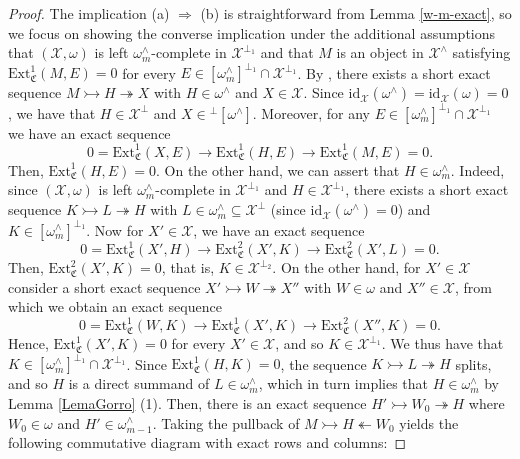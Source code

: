 \documentclass[10pt,reqno]{amsart}
\numberwithin{equation}{section}
\theoremstyle{remark}
\newcommand{\Ext}{\mathrm{Ext}}
\newcommand{\id}{\mathrm{id}}
\begin{document}
\begin{proof} 
The implication (a) $\Rightarrow$ (b) is straightforward from Lemma \ref{w-m-exact}, so we focus on showing the converse implication under the additional assumptions that $(\mathcal{X},\omega)$ is left $\omega^\wedge_m$-complete in $\mathcal{X}^{\perp_1}$ and that $M$ is an object in $\mathcal{X}^\wedge$ satisfying $\Ext^1_{\mathfrak{C}}(M,E) = 0$ for every $E \in [\omega^\wedge_m]^{\perp_1} \cap \mathcal{X}^{\perp_1}$. By \cite[Thm. 2.8]{BMSP}, there exists a short exact sequence $M \rightarrowtail H \twoheadrightarrow X$ with $H \in \omega^\wedge$ and $X \in \mathcal{X}$. Since $\id_{\mathcal{X}}(\omega^\wedge) = \id_{\mathcal{X}}(\omega) = 0$, we have that $H \in \mathcal{X}^{\perp}$ and $X \in {}^\perp[\omega^\wedge]$. Moreover, for any $E \in [\omega^\wedge_m]^{\perp_1} \cap \mathcal{X}^{\perp_1}$ we have an exact sequence
\[
0 = \Ext^1_{\mathfrak{C}}(X,E) \to \Ext^1_{\mathfrak{C}}(H,E) \to \Ext^1_{\mathfrak{C}}(M,E) = 0.
\]
Then, $\Ext^1_{\mathfrak{C}}(H,E) = 0$. On the other hand, we can assert that $H \in \omega^\wedge_m$. Indeed, since $(\mathcal{X},\omega)$ is left $\omega^\wedge_m$-complete in $\mathcal{X}^{\perp_1}$ and $H \in \mathcal{X}^{\perp_1}$, there exists a short exact sequence $K \rightarrowtail L \twoheadrightarrow H$ with $L \in \omega^\wedge_m \subseteq \mathcal{X}^{\perp}$ (since $\id_{\mathcal{X}}(\omega^\wedge) = 0$) and $K \in [\omega^\wedge_m]^{\perp_1}$. Now for $X' \in \mathcal{X}$, we have an exact sequence
\[
0 = \Ext^1_{\mathfrak{C}}(X',H) \to \Ext^2_{\mathfrak{C}}(X',K) \to \Ext^2_{\mathfrak{C}}(X',L) = 0.
\]
Then, $\Ext^2_{\mathfrak{C}}(X',K) = 0$, that is, $K \in \mathcal{X}^{\perp_2}$. On the other hand, for $X' \in \mathcal{X}$ consider a short exact sequence $X' \rightarrowtail W \twoheadrightarrow X''$ with $W \in \omega$ and $X'' \in \mathcal{X}$, from which we obtain an exact sequence
\[
0 = \Ext^1_{\mathfrak{C}}(W,K) \to \Ext^1_{\mathfrak{C}}(X',K) \to \Ext^2_{\mathfrak{C}}(X'',K) = 0.
\]
Hence, $\Ext^1_{\mathfrak{C}}(X',K) = 0$ for every $X' \in \mathcal{X}$, and so $K \in \mathcal{X}^{\perp_1}$. We thus have that $K \in [\omega^\wedge_m]^{\perp_1} \cap \mathcal{X}^{\perp_1}$. Since $\Ext^1_{\mathfrak{C}}(H,K) = 0$, the sequence $K \rightarrowtail L \twoheadrightarrow H$ splits, and so $H$ is a direct summand of $L \in \omega^\wedge_m$, which in turn implies that $H \in \omega^\wedge_m$ by Lemma \ref{LemaGorro} (1). Then, there is an exact sequence $H' \rightarrowtail W_0 \twoheadrightarrow H$ where $W_0 \in \omega$ and $H' \in \omega^\wedge_{m-1}$. Taking the pullback of $M \rightarrowtail H \twoheadleftarrow W_0$ yields the following commutative diagram with exact rows and columns:

\end{proof}
\end{document}
